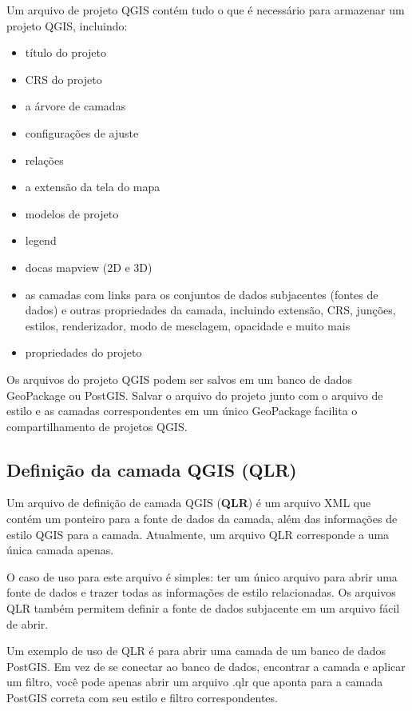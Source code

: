 \documentclass[
]{krantz}
\providecommand{\tightlist}{%
  \setlength{\itemsep}{0pt}\setlength{\parskip}{0pt}}
\begin{document}
Um arquivo de projeto QGIS contém tudo o que é necessário para armazenar um projeto QGIS, incluindo:

\begin{itemize}
\tightlist
\item
  título do projeto
\item
  CRS do projeto
\item
  a árvore de camadas
\item
  configurações de ajuste
\item
  relações
\item
  a extensão da tela do mapa
\item
  modelos de projeto
\item
  legend
\item
  docas mapview (2D e 3D)
\item
  as camadas com links para os conjuntos de dados subjacentes (fontes de dados) e outras propriedades da camada, incluindo extensão, CRS, junções, estilos, renderizador, modo de mesclagem, opacidade e muito mais
\item
  propriedades do projeto
\end{itemize}

Os arquivos do projeto QGIS podem ser salvos em um banco de dados GeoPackage ou PostGIS. Salvar o arquivo do projeto junto com o arquivo de estilo e as camadas correspondentes em um único GeoPackage facilita o compartilhamento de projetos QGIS.

\hypertarget{definiuxe7uxe3o-da-camada-qgis-qlr}{%
\subsection{Definição da camada QGIS (QLR)}\label{definiuxe7uxe3o-da-camada-qgis-qlr}}

Um arquivo de definição de camada QGIS (\textbf{QLR}) é um arquivo XML que contém um ponteiro para a fonte de dados da camada, além das informações de estilo QGIS para a camada. Atualmente, um arquivo QLR corresponde a uma única camada apenas.

O caso de uso para este arquivo é simples: ter um único arquivo para abrir uma fonte de dados e trazer todas as informações de estilo relacionadas. Os arquivos QLR também permitem definir a fonte de dados subjacente em um arquivo fácil de abrir.

Um exemplo de uso de QLR é para abrir uma camada de um banco de dados PostGIS. Em vez de se conectar ao banco de dados, encontrar a camada e aplicar um filtro, você pode apenas abrir um arquivo .qlr que aponta para a camada PostGIS correta com seu estilo e filtro correspondentes.
\end{document}
